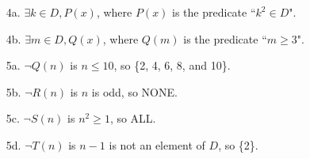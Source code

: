 {\begin{enumerate}
    \item[4a.]      $\exists k \in D, P(x)$, where $P(x)$ is the predicate ``$k^{2} \in D$".
    \item[4b.]      $\exists m \in D, Q(x)$, where $Q(m)$ is the predicate ``$m \geq 3$".

    \item[5a.]      $\neg Q(n)$ is $n \leq 10$, so \{2, 4, 6, 8, and 10\}.
    \item[5b.]      $\neg R(n)$ is $n$ is odd, so NONE.
    \item[5c.]      $\neg S(n)$ is $n^{2} \geq 1$, so ALL.
    \item[5d.]      $\neg T(n)$ is $n-1$ is not an element of $D$, so \{2\}.
\end{enumerate}

}


